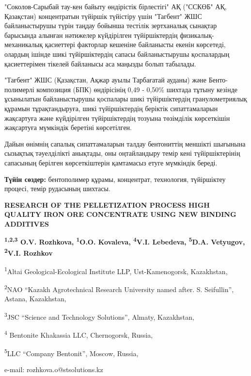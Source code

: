 "Соколов-Сарыбай тау-кен байыту өндірістік бірлестігі" АҚ ("ССКӨБ" АҚ,
Қазақстан) концентратын түйіршік түйістіру үшін "Тагбент" ЖШС
байланыстырушы түрін таңдау бойынша тестілік зертханалық сынақтар
барысында алынған нәтижелер күйдірілген түйіршіктердің
физикалық-механикалық қасиеттері факторлар кешеніне байланысты екенін
көрсетеді, олардың ішінде шикі түйіршіктердің сапасы байланыстырушы
қоспалардың қасиеттерімен тікелей байланысы аса маңызды болып табылады.

"Тағбент" ЖШС (Қазақстан, Ақжар ауылы Тарбағатай ауданы) және
Бенто-полимерлі композиция (БПК) өндірісінің 0,49 - 0,50\% шихтада
тұтыну кезінде ұсынылатын байланыстырушы қоспалары шикі түйіршіктердің
гранулометриялық құрамын тұрақтандыруға, шикі түйіршіктердің беріктік
сипаттамаларын жақсартуға және күйдірілген түйіршіктердің тозуына
төзімділік көрсеткішін жақсартуға мүмкіндік беретіні көрсетілген.

Дайын өнімнің сапалық сипаттамаларын талдау бентониттің меншікті
шығынына сызықтық тәуелділікті анықтады, оны оңтайландыру темір кені
түйіршіктерінің сапасының берілген көрсеткіштерін қамтамасыз етуге
мүмкіндік береді.

{\bfseries Түйін сөздер:} бентополимер құрамы, концентрат, технология,
түйіршіктеу процесі, темір рудасының шихтасы.
\vspace{-0.5em}
\begin{articleheader}
{\bfseries RESEARCH OF THE PELLETIZATION PROCESS HIGH QUALITY IRON ORE CONCENTRATE USING NEW BINDING ADDITIVES}

{\bfseries
\textsuperscript{1,2,3} O.V. Rozhkova\textsuperscript{\envelope },
\textsuperscript{1}O.O. Kovaleva,
\textsuperscript{4}V.I. Lebedeva,
\textsuperscript{5}D.A. Vetyugov,
\textsuperscript{2}V.I. Rozhkov
}
\end{articleheader}

\begin{affiliation}
\textsuperscript{1}Altai Geological-Ecological Institute LLP, Ust-Kamenogorsk, Kazakhstan,

\textsuperscript{2}NAO ``Kazakh Agrotechnical Research University named after. S. Seifullin'', Astana, Kazakhstan,

\textsuperscript{3}JSC ``Science and Technology Solutions'', Almaty, Kazakhstan,

\textsuperscript{4} Bentonite Khakassia LLC, Chernogorsk, Russia,

\textsuperscript{5}LLC ``Company Bentonit'', Moscow, Russia,

e-mail: rozhkova.o@stsolutions.kz
\end{affiliation}

